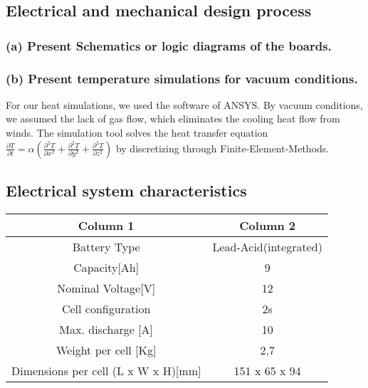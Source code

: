\subsection{Electrical and mechanical design process}
\subsubsection{(a) Present Schematics or logic diagrams of the boards.}
\subsubsection{(b) Present temperature simulations for vacuum conditions.}
For our heat simulations, we used the software of ANSYS. By vacuum conditions, we assumed the
lack of gas flow, which eliminates the cooling heat flow from winds. The simulation tool solves
the heat transfer equation \( \frac{\partial T}{\partial t} = \alpha \left( \frac{\partial^2 T}{\partial x^2} + \frac{\partial^2 T}{\partial y^2} + \frac{\partial^2 T}{\partial z^2} \right) \)
by discretizing through Finite-Element-Methods.

\subsection{Electrical system characteristics}
\begin{table}
    \centering
    \begin{adjustbox}{width=\textwidth,center}
    \begin{tabular}{|c|c|}
       \hline
       \textbf{Column 1} & \textbf{Column 2}  \\
       \hline
       Battery Type & Lead-Acid(integrated)\\
       \hline
       Capacity[Ah] & 9 \\
       \hline
       Nominal Voltage[V] & 12 \\
       \hline
       Cell configuration & 2s \\
       \hline
       Max. discharge [A] & 10 \\
       \hline
       Weight per cell [Kg] & 2,7 \\
       \hline 
       Dimensions per cell (L x W x H)[mm] & 151 x 65 x 94 \\
       \hline 
    \end{tabular}
    \end{adjustbox}
    \label{Low Voltage Battery Specs}
\end{table}    

